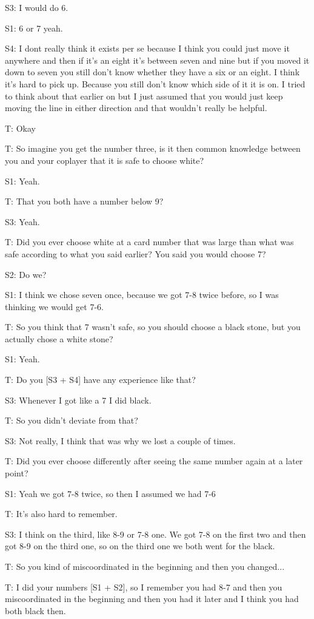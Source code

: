 \documentclass[a4paper,superscriptaddress,nofootinbib]{revtex4}
\begin{document}
S3: I would do 6.

S1: 6 or 7 yeah.

S4: I dont really think it exists per se because I think you could just move it anywhere and then if it's an eight it's between seven and nine but if you moved it down to seven you still don't know whether they have a six or an eight. I think it's hard to pick up. Because you still don't know which side of it it is on. I tried to think about that earlier on but I just assumed that you would just keep moving the line in either direction and that wouldn't really be helpful.

T: Okay

T: So imagine you get the number three, is it then common knowledge between you and your coplayer that it is safe to choose white?

S1: Yeah.

T: That you both have a number below 9?

S3: Yeah.

T: Did you ever choose white at a card number that was large than what was safe according to what you said earlier? You said you would choose 7?

S2: Do we?

S1: I think we chose seven once, because we got 7-8 twice before, so I was thinking we would get 7-6.

T: So you think that 7 wasn't safe, so you should choose a black stone, but you actually chose a white stone?

S1: Yeah.

T: Do you [S3 + S4] have any experience like that?

S3: Whenever I got like a 7 I did black.

T: So you didn't deviate from that?

S3: Not really, I think that was why we lost a couple of times.

T: Did you ever choose differently after seeing the same number again at a later point?

S1: Yeah we got 7-8 twice, so then I assumed we had 7-6

T: It's also hard to remember.

S3: I think on the third, like 8-9 or 7-8 one. We got 7-8 on the first two and then got 8-9 on the third one, so on the third one we both went for the black.

T: So you kind of miscoordinated in the beginning and then you changed...

T: I did your numbers [S1 + S2], so I remember you had 8-7 and then you miscoordinated in the beginning and then you had it later and I think you had both black then.
\end{document}
